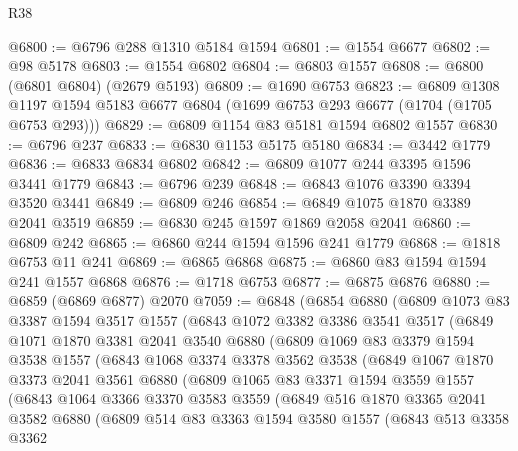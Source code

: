 \begin{lexlean}{R38}
\begin{coremodule}
@6800 := @6796 @288 @1310 @5184 @1594
@6801 := @1554 @6677
@6802 := @98 @5178
@6803 := @1554 @6802
@6804 := @6803 @1557
@6808 := @6800 (@6801 @6804) (@2679 @5193)
@6809 := @1690 @6753
@6823 := @6809
    @1308
    @1197
    @1594
    @5183
    @6677
    @6804
    (@1699 @6753 @293 @6677 (@1704 (@1705 @6753 @293)))
@6829 := @6809 @1154 @83 @5181 @1594 @6802 @1557
@6830 := @6796 @237
@6833 := @6830 @1153 @5175 @5180
@6834 := @3442 @1779
@6836 := @6833 @6834 @6802
@6842 := @6809 @1077 @244 @3395 @1596 @3441 @1779
@6843 := @6796 @239
@6848 := @6843 @1076 @3390 @3394 @3520 @3441
@6849 := @6809 @246
@6854 := @6849 @1075 @1870 @3389 @2041 @3519
@6859 := @6830 @245 @1597 @1869 @2058 @2041
@6860 := @6809 @242
@6865 := @6860 @244 @1594 @1596 @241 @1779
@6868 := @1818 @6753 @11 @241
@6869 := @6865 @6868
@6875 := @6860 @83 @1594 @1594 @241 @1557 @6868
@6876 := @1718 @6753
@6877 := @6875 @6876
@6880 := @6859 (@6869 @6877) @2070
@7059 := @6848
    (@6854
      @6880
      (@6809
        @1073
        @83
        @3387
        @1594
        @3517
        @1557
        (@6843
          @1072
          @3382
          @3386
          @3541
          @3517
          (@6849
            @1071
            @1870
            @3381
            @2041
            @3540
            @6880
            (@6809
              @1069
              @83
              @3379
              @1594
              @3538
              @1557
              (@6843
                @1068
                @3374
                @3378
                @3562
                @3538
                (@6849
                  @1067
                  @1870
                  @3373
                  @2041
                  @3561
                  @6880
                  (@6809
                    @1065
                    @83
                    @3371
                    @1594
                    @3559
                    @1557
                    (@6843
                      @1064
                      @3366
                      @3370
                      @3583
                      @3559
                      (@6849
                        @516
                        @1870
                        @3365
                        @2041
                        @3582
                        @6880
                        (@6809
                          @514
                          @83
                          @3363
                          @1594
                          @3580
                          @1557
                          (@6843
                            @513
                            @3358
                            @3362

\end{coremodule}
\end{lexlean}
